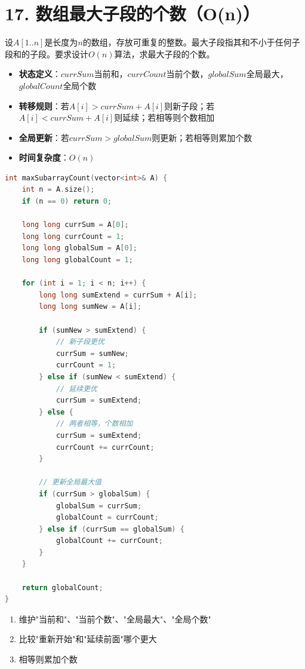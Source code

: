 \section*{17. 数组最大子段的个数（O(n)）}

设$A[1..n]$是长度为$n$的数组，存放可重复的整数。最大子段指其和不小于任何子段和的子段。要求设计$O(n)$算法，求最大子段的个数。



\begin{itemize}
    \item \textbf{状态定义}：$currSum$当前和，$currCount$当前个数，$globalSum$全局最大，$globalCount$全局个数
    \item \textbf{转移规则}：若$A[i] > currSum + A[i]$则新子段；若$A[i] < currSum + A[i]$则延续；若相等则个数相加
    \item \textbf{全局更新}：若$currSum > globalSum$则更新；若相等则累加个数
    \item \textbf{时间复杂度}：$O(n)$
\end{itemize}
\begin{lstlisting}[language=C++, style=cppstyle]
int maxSubarrayCount(vector<int>& A) {
    int n = A.size();
    if (n == 0) return 0;

    long long currSum = A[0];
    long long currCount = 1;
    long long globalSum = A[0];
    long long globalCount = 1;

    for (int i = 1; i < n; i++) {
        long long sumExtend = currSum + A[i];
        long long sumNew = A[i];

        if (sumNew > sumExtend) {
            // 新子段更优
            currSum = sumNew;
            currCount = 1;
        } else if (sumNew < sumExtend) {
            // 延续更优
            currSum = sumExtend;
        } else {
            // 两者相等，个数相加
            currSum = sumExtend;
            currCount += currCount;
        }

        // 更新全局最大值
        if (currSum > globalSum) {
            globalSum = currSum;
            globalCount = currCount;
        } else if (currSum == globalSum) {
            globalCount += currCount;
        }
    }

    return globalCount;
}
\end{lstlisting}


\begin{enumerate}
    \item 维护"当前和"、"当前个数"、"全局最大"、"全局个数"
    \item 比较"重新开始"和"延续前面"哪个更大
    \item 相等则累加个数
\end{enumerate}

